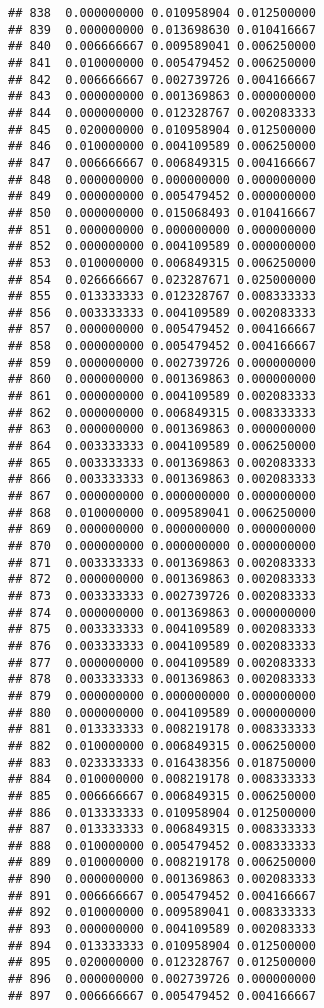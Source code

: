 \documentclass[
]{article}
\begin{document}
\begin{verbatim}
## 838  0.000000000 0.010958904 0.012500000
## 839  0.000000000 0.013698630 0.010416667
## 840  0.006666667 0.009589041 0.006250000
## 841  0.010000000 0.005479452 0.006250000
## 842  0.006666667 0.002739726 0.004166667
## 843  0.000000000 0.001369863 0.000000000
## 844  0.000000000 0.012328767 0.002083333
## 845  0.020000000 0.010958904 0.012500000
## 846  0.010000000 0.004109589 0.006250000
## 847  0.006666667 0.006849315 0.004166667
## 848  0.000000000 0.000000000 0.000000000
## 849  0.000000000 0.005479452 0.000000000
## 850  0.000000000 0.015068493 0.010416667
## 851  0.000000000 0.000000000 0.000000000
## 852  0.000000000 0.004109589 0.000000000
## 853  0.010000000 0.006849315 0.006250000
## 854  0.026666667 0.023287671 0.025000000
## 855  0.013333333 0.012328767 0.008333333
## 856  0.003333333 0.004109589 0.002083333
## 857  0.000000000 0.005479452 0.004166667
## 858  0.000000000 0.005479452 0.004166667
## 859  0.000000000 0.002739726 0.000000000
## 860  0.000000000 0.001369863 0.000000000
## 861  0.000000000 0.004109589 0.002083333
## 862  0.000000000 0.006849315 0.008333333
## 863  0.000000000 0.001369863 0.000000000
## 864  0.003333333 0.004109589 0.006250000
## 865  0.003333333 0.001369863 0.002083333
## 866  0.003333333 0.001369863 0.002083333
## 867  0.000000000 0.000000000 0.000000000
## 868  0.010000000 0.009589041 0.006250000
## 869  0.000000000 0.000000000 0.000000000
## 870  0.000000000 0.000000000 0.000000000
## 871  0.003333333 0.001369863 0.002083333
## 872  0.000000000 0.001369863 0.002083333
## 873  0.003333333 0.002739726 0.002083333
## 874  0.000000000 0.001369863 0.000000000
## 875  0.003333333 0.004109589 0.002083333
## 876  0.003333333 0.004109589 0.002083333
## 877  0.000000000 0.004109589 0.002083333
## 878  0.003333333 0.001369863 0.002083333
## 879  0.000000000 0.000000000 0.000000000
## 880  0.000000000 0.004109589 0.000000000
## 881  0.013333333 0.008219178 0.008333333
## 882  0.010000000 0.006849315 0.006250000
## 883  0.023333333 0.016438356 0.018750000
## 884  0.010000000 0.008219178 0.008333333
## 885  0.006666667 0.006849315 0.006250000
## 886  0.013333333 0.010958904 0.012500000
## 887  0.013333333 0.006849315 0.008333333
## 888  0.010000000 0.005479452 0.008333333
## 889  0.010000000 0.008219178 0.006250000
## 890  0.000000000 0.001369863 0.002083333
## 891  0.006666667 0.005479452 0.004166667
## 892  0.010000000 0.009589041 0.008333333
## 893  0.000000000 0.004109589 0.002083333
## 894  0.013333333 0.010958904 0.012500000
## 895  0.020000000 0.012328767 0.012500000
## 896  0.000000000 0.002739726 0.000000000
## 897  0.006666667 0.005479452 0.004166667

\end{verbatim}
\end{document}
